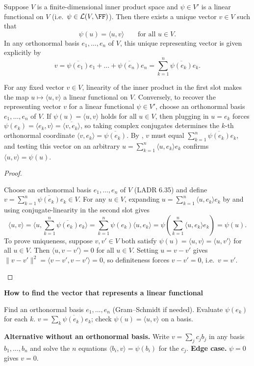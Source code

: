 \documentclass[10pt]{scrartcl}
\newcommand{\ip}[2]{\langle #1,#2\rangle}
\newcommand{\LL}{\mathcal L}\newcommand{\PP}{\mathcal P}\newcommand{\MM}{\mathcal M}
\newenvironment{methodbox}[1]{\begin{mdframed}[style=mdbluebox,linecolor=NavyBlue,backgroundcolor=NavyBlue!3]\textbf{\color{NavyBlue}#1}\par\vspace{2pt}}{\end{mdframed}}
\begin{document}
\begin{theorem*}
  Suppose $V$ is a finite-dimensional inner product space and $\psi\in V'$ is a linear functional on $V$ (i.e.\ $\psi\in\LL(V,\FF)$). Then there exists a unique vector $v\in V$ such that
  \[
    \psi(u) = \ip uv \qquad\text{for all }u\in V.
  \]
  In any orthonormal basis $e_1,\dots,e_n$ of $V$, this unique representing vector is given explicitly by
  \[
    v = \overline{\psi(e_1)}e_1 + \dots + \overline{\psi(e_n)}e_n = \sum_{k=1}^n \overline{\psi(e_k)}e_k.
  \]
\end{theorem*}
\begin{ideabox}
  For any fixed vector $v\in V$, linearity of the inner product in the first slot makes the map $u\mapsto\ip uv$ a linear functional on $V$. Conversely, to recover the representing vector $v$ for a linear functional $\psi\in V'$, choose an orthonormal basis $e_1,\dots,e_n$ of $V$. If $\psi(u)=\ip uv$ holds for all $u\in V$, then plugging in $u=e_k$ forces $\psi(e_k)=\ip{e_k}{v}=\overline{\ip v{e_k}}$, so taking complex conjugates determines the $k$-th orthonormal coordinate $\ip v{e_k}=\overline{\psi(e_k)}$. By , $v$ must equal $\sum_{k=1}^n\overline{\psi(e_k)}e_k$, and testing this vector on an arbitrary $u=\sum_{k=1}^n\ip u{e_k}e_k$ confirms $\ip uv=\psi(u)$.
\end{ideabox}
\begin{proof}
  \begin{steps}
    \ii Choose an orthonormal basis $e_1,\dots,e_n$ of $V$ (LADR 6.35) and define $v=\sum_{k=1}^n\overline{\psi(e_k)}e_k\in V$.
    \ii For any $u\in V$, expanding $u=\sum_{k=1}^n\ip u{e_k}e_k$ by  and using conjugate-linearity in the second slot gives
    \[
      \ip uv = \ip{u}{\sum_{k=1}^n\overline{\psi(e_k)}e_k} = \sum_{k=1}^n \psi(e_k)\ip u{e_k} = \psi\left(\sum_{k=1}^n\ip u{e_k}e_k\right) = \psi(u).
    \]
    \ii To prove uniqueness, suppose $v,v'\in V$ both satisfy $\psi(u)=\ip uv=\ip u{v'}$ for all $u\in V$. Then $\ip u{v-v'}=0$ for all $u\in V$. Setting $u=v-v'$ gives $\|v-v'\|^2=\ip{v-v'}{v-v'}=0$, so definiteness forces $v-v'=0$, i.e.\ $v=v'$.
  \end{steps}
\end{proof}

\begin{methodbox}{How to find the vector that represents a linear functional}
\begin{enumerate}[label=\arabic*.,leftmargin=1.5em,itemsep=2pt,topsep=2pt]
  \ii Find an orthonormal basis $e_1,\dots,e_n$ (Gram--Schmidt if needed).
  \ii Evaluate $\psi(e_k)$ for each $k$.
  \ii $v=\sum_k\overline{\psi(e_k)}e_k$; check $\psi(u)=\ip uv$ on a basis.
\end{enumerate}
\textbf{Alternative without an orthonormal basis.} Write $v=\sum_jc_jb_j$ in any basis $b_1,\dots,b_n$ and solve the $n$ equations $\ip{b_i}{v}=\psi(b_i)$ for the $c_j$. \textbf{Edge case.} $\psi=0$ gives $v=0$.
\end{methodbox}
\end{document}
